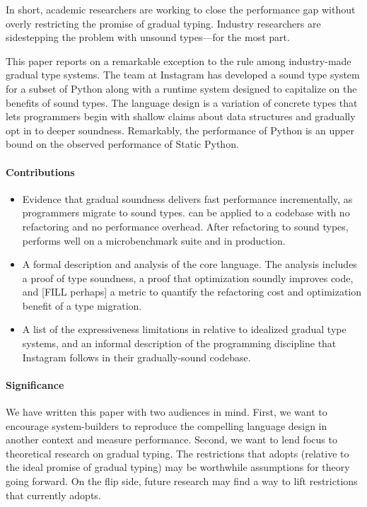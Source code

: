 \documentclass[a4paper,english,cleveref,autoref,thm-restate,anonymous,]{lipics-v2021}
\begin{document}
In short, academic researchers are working to close the performance gap
without overly restricting the promise of gradual typing.
Industry researchers are sidestepping the problem with unsound types---for the most part.

This paper reports on a remarkable exception to the rule among industry-made gradual type systems.
The \SP{} team at Instagram has developed a sound type system for a subset of
Python along with a runtime system designed to
capitalize on the benefits of sound types.
The language design is a variation of concrete types that lets programmers
begin with shallow claims about data structures and gradually opt in to deeper soundness.
Remarkably, the performance of Python is an upper bound on the observed performance of
Static Python.


\paragraph*{Contributions}

\begin{itemize}
  \item
    Evidence that gradual soundness delivers fast performance incrementally,
    as programmers migrate to sound types.
    \SP{} can be applied to a codebase with no refactoring and no performance overhead.
    After refactoring to sound types, \SP{} performs well on a microbenchmark
    suite and in production.
  \item
    A formal description and analysis of the \SP{} core language.
    The analysis includes a proof of type soundness,
    a proof that optimization soundly improves code,
    and [FILL perhaps] a metric to quantify the refactoring cost and optimization benefit
    of a type migration.
  \item
    A list of the expressiveness limitations in \SP{} relative to
    idealized gradual type systems,
    and an informal description of the programming discipline that Instagram
    follows in their gradually-sound codebase.
\end{itemize}


\paragraph*{Significance}

We have written this paper with two audiences in mind.
First, we want to encourage system-builders to reproduce the compelling
\SP{} language design in another context and measure performance.
Second, we want to lend focus to theoretical research on gradual typing.
The restrictions that \SP{} adopts (relative to the ideal promise of gradual typing)
may be worthwhile assumptions for theory going forward.
On the flip side, future research may find a way to lift restrictions
that \SP{} currently adopts.
\end{document}
